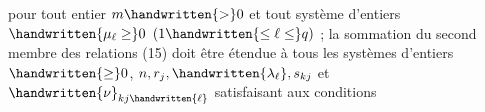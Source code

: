 pour tout entier $m\handwritten{>}0$ et tout système d'entiers $\handwritten{\mu_\ell\geq}0$ $(1\handwritten{\leq\ell\leq}q)$ ; la sommation du second membre des relations (15) doit être étendue à tous les systèmes d'entiers $\handwritten{\geq}0$, $n,r_j,\handwritten{\lambda_\ell},s_{kj}$ et $\handwritten{\nu}_{kj\handwritten{\ell}}$ satisfaisant aux conditions
